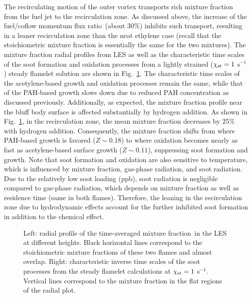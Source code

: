 \documentclass[review,3p,times]{elsarticle}
\begin{document}
\textcolor{Rv1}{The recirculating motion of the outer vortex transports rich mixture fraction from the fuel jet to the recirculation zone.  }As discussed above, the increase of the fuel/coflow momentum flux ratio~\textcolor{Rv1}{(about 30\%)} inhibits \textcolor{Rv1}{such transport}, resulting in a leaner recirculation zone than the neat ethylene case (recall that the stoichiometric mixture fraction is essentially the same for the two mixtures).  The mixture fraction radial profiles from LES as well as the characteristic time scales of the soot formation and oxidation processes from a lightly strained ($\chi_{\rm st} = 1$ s$^{-1}$) steady flamelet solution are shown in Fig.~\ref{fig:timescale}.  The characteristic time scales of the acetylene-based growth and oxidation processes remain the same, while that of the PAH-based growth slows down due to reduced PAH concentration as discussed previously.  Additionally, as expected, the mixture fraction profile near the bluff body surface is affected substantially by hydrogen addition.  As shown in Fig.~\ref{fig:timescale}, in the recirculation zone, the mean mixture fraction decreases by $25$\% with hydrogen addition.  Consequently, the mixture fraction shifts from where PAH-based growth is favored ($Z \sim 0.18$) to where oxidation becomes nearly as fast as acetylene-based surface growth ($Z \sim 0.11$), suppressing soot formation and growth.  Note that soot formation and oxidation are also sensitive to temperature, which is influenced by mixture fraction, gas-phase radiation, and soot radiation.  Due to the relatively low soot loading (ppb), soot radiation is negligible compared to gas-phase radiation, which depends on mixture fraction as well as residence time (same in both flames).  Therefore, the leaning in the recirculation zone due to hydrodynamic effects account for the further inhibited soot formation in addition to the chemical effect.

\begin{figure}[t]
  \centering
  \scriptsize
  \resizebox{0.49\textwidth}{!}{}
  \resizebox{0.49\textwidth}{!}{}
  \vspace{-0.3in}
  \normalsize
  \caption{Left: radial profile of the time-averaged mixture fraction~\textcolor{Rv1}{in the LES at different heights.  Black horizontal} lines correspond to the stoichiometric mixture fractions of these two flames and almost overlap.  Right: characteristic inverse time scales of the soot processes from the steady flamelet calculations at $\chi_{\rm st} = 1$ s$^{-1}$.  Vertical lines correspond to the mixture fraction in the flat regions of the radial plot.}
  \label{fig:timescale}
\end{figure}
\end{document}
